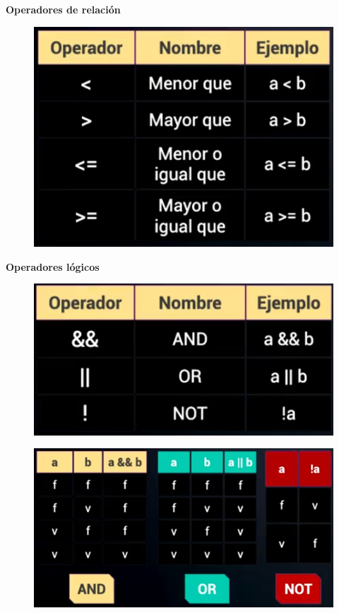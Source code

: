 \documentclass{article}
\begin{document}
\textbf{Operadores de relación}\\
\begin{figure}[h!]
  \centering
  \includegraphics[scale=0.75]{./Pictures/020_relacionales.png}
\end{figure}

\newpage

\textbf{Operadores lógicos}\\
\begin{figure}[h!]
  \centering
  \includegraphics[scale=0.75]{./Pictures/021_logicos.png}
\end{figure}

\begin{figure}[h!]
  \centering
  \includegraphics[scale=0.75]{./Pictures/022_logicos.png}
\end{figure}
\end{document}
